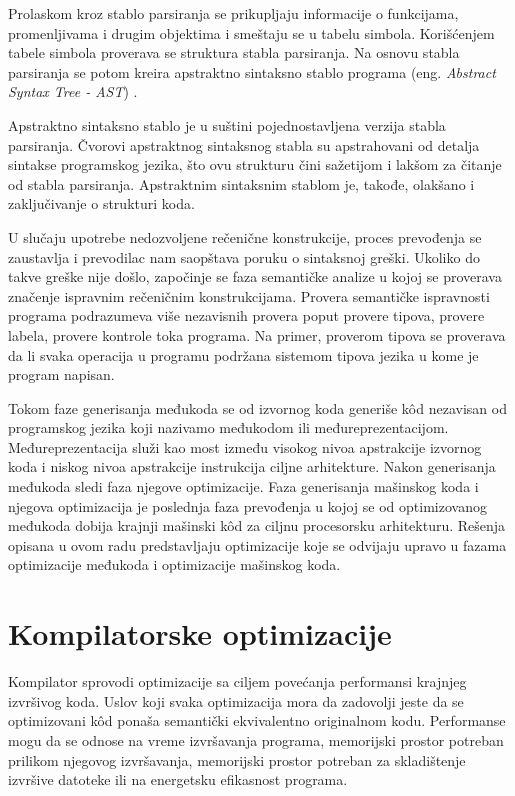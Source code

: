 \documentclass[12pt,oneside]{memoir}
\begin{document}
Prolaskom kroz stablo parsiranja se prikupljaju informacije o funkcijama, promenljivama i drugim objektima i smeštaju se u tabelu simbola. Korišćenjem tabele simbola proverava se struktura stabla parsiranja. Na osnovu stabla parsiranja se potom kreira apstraktno sintaksno stablo programa (eng. \textit{Abstract Syntax Tree - AST}) \cite{ast}. 

Apstraktno sintaksno stablo je u suštini pojednostavljena verzija stabla parsiranja. 
Čvorovi apstraktnog sintaksnog stabla su apstrahovani od detalja sintakse programskog jezika, što ovu strukturu čini sažetijom i lakšom za čitanje od stabla parsiranja.
Apstraktnim sintaksnim stablom je, takođe, olakšano i zaključivanje o strukturi koda.

U slučaju upotrebe nedozvoljene rečenične konstrukcije, proces prevođenja se zaustavlja i prevodilac nam saopštava poruku o sintaksnoj greški. Ukoliko do takve greške nije došlo, započinje se faza semantičke analize u kojoj se proverava značenje ispravnim rečeničnim konstrukcijama. Provera semantičke ispravnosti programa podrazumeva više nezavisnih provera poput provere tipova, provere labela, provere kontrole toka programa. Na primer, proverom tipova se proverava da li svaka operacija u programu podržana sistemom tipova jezika u kome je program napisan.

Tokom faze generisanja međukoda se od izvornog koda generiše k\^od nezavisan od programskog jezika koji nazivamo međukodom ili međureprezentacijom. Međureprezentacija služi kao most između visokog nivoa apstrakcije izvornog koda i niskog nivoa apstrakcije instrukcija ciljne arhitekture. Nakon generisanja međukoda sledi faza njegove optimizacije. Faza generisanja mašinskog koda i njegova optimizacija je poslednja faza prevođenja u kojoj se od optimizovanog međukoda dobija krajnji mašinski k\^od za ciljnu procesorsku arhitekturu. Rešenja opisana u ovom radu predstavljaju optimizacije koje se odvijaju upravo u fazama optimizacije međukoda i optimizacije mašinskog koda.



\section{Kompilatorske optimizacije}
\label{sec:compiler_optimization}
Kompilator sprovodi optimizacije sa ciljem povećanja performansi krajnjeg izvršivog koda. Uslov koji svaka optimizacija mora da zadovolji jeste da se optimizovani k\^od ponaša semantički ekvivalentno originalnom kodu. Performanse mogu da se odnose na vreme izvršavanja programa, memorijski prostor potreban prilikom njegovog izvršavanja, memorijski prostor potreban za skladištenje izvršive datoteke ili na energetsku efikasnost programa. 
\end{document}
